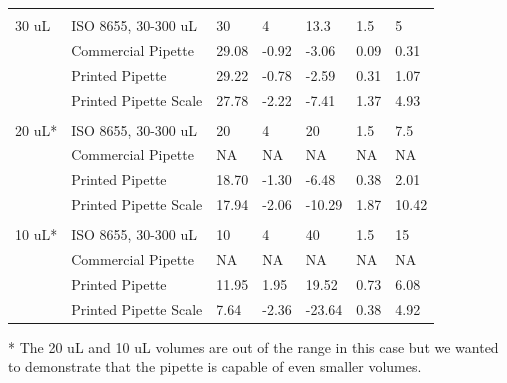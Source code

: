 \documentclass[10pt,letterpaper]{article}
\begin{document}
\begin{table}[!ht]
\begin{adjustwidth}{-2.25in}{0in}
\begin{tabular}{lllllll}
       &                       &        &                  &              &              &               \\
30 uL  & ISO 8655, 30-300 uL   & 30     & 4                & 13.3         & 1.5          & 5             \\
       & Commercial Pipette    & 29.08  & -0.92            & -3.06        & 0.09         & 0.31          \\
       & Printed Pipette       & 29.22  & -0.78            & -2.59        & 0.31         & 1.07          \\
       & Printed Pipette Scale & 27.78  & -2.22            & -7.41        & 1.37         & 4.93          \\
       &                       &        &                  &              &              &               \\
20 uL* & ISO 8655, 30-300 uL   & 20     & 4                & 20           & 1.5          & 7.5           \\
       & Commercial Pipette    & NA     & NA               & NA           & NA           & NA            \\
       & Printed Pipette       & 18.70  & -1.30            & -6.48        & 0.38         & 2.01          \\
       & Printed Pipette Scale & 17.94  & -2.06            & -10.29       & 1.87         & 10.42         \\
       &                       &        &                  &              &              &               \\
10 uL* & ISO 8655, 30-300 uL   & 10     & 4                & 40           & 1.5          & 15            \\
       & Commercial Pipette    & NA     & NA               & NA           & NA           & NA            \\
       & Printed Pipette       & 11.95  & 1.95             & 19.52        & 0.73         & 6.08          \\
       & Printed Pipette Scale & 7.64   & -2.36            & -23.64       & 0.38         & 4.92         
\end{tabular}
\begin{flushleft} * The 20 uL and 10 uL volumes are out of the range in this case but we wanted to demonstrate that the pipette is capable of even smaller volumes.
\end{flushleft}
\end{adjustwidth}
\end{table}
\end{document}
